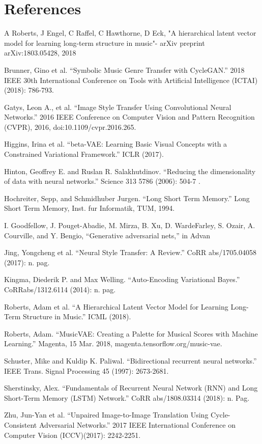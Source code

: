 \documentclass{article}
\begin{document}



\section{References}

A Roberts, J Engel, C Raffel, C Hawthorne, D Eck, "A hierarchical latent vector model for learning long-term structure in music"- arXiv preprint arXiv:1803.05428, 2018

Brunner, Gino et al. “Symbolic Music Genre Transfer with CycleGAN.” 2018 IEEE 30th International Conference on Tools with Artificial Intelligence (ICTAI) (2018): 786-793.

Gatys, Leon A., et al. “Image Style Transfer Using Convolutional Neural Networks.” 2016 IEEE Conference on Computer Vision and Pattern Recognition (CVPR), 2016, doi:10.1109/cvpr.2016.265.

Higgins, Irina et al. “beta-VAE: Learning Basic Visual Concepts with a Constrained Variational Framework.” ICLR (2017).

Hinton, Geoffrey E. and Ruslan R. Salakhutdinov. “Reducing the dimensionality of data with neural networks.” Science 313 5786 (2006): 504-7 .

Hochreiter, Sepp, and Schmidhuber Jurgen. “Long Short Term Memory.” Long Short Term Memory, Inst. fur Informatik, TUM, 1994.

I. Goodfellow, J. Pouget-Abadie, M. Mirza, B. Xu, D. WardeFarley, S. Ozair, A. Courville, and Y. Bengio, “Generative adversarial nets,” in Advan

Jing, Yongcheng et al. “Neural Style Transfer: A Review.” CoRR abs/1705.04058 (2017): n. pag.

Kingma, Diederik P. and Max Welling. “Auto-Encoding Variational Bayes.” CoRRabs/1312.6114 (2014): n. pag.

Roberts, Adam et al. “A Hierarchical Latent Vector Model for Learning Long-Term Structure in Music.” ICML (2018).

Roberts, Adam. “MusicVAE: Creating a Palette for Musical Scores with Machine Learning.” Magenta, 15 Mar. 2018, magenta.tensorflow.org/music-vae.

Schuster, Mike and Kuldip K. Paliwal. “Bidirectional recurrent neural networks.” IEEE Trans. Signal Processing 45 (1997): 2673-2681.

Sherstinsky, Alex. “Fundamentals of Recurrent Neural Network (RNN) and Long Short-Term Memory (LSTM) Network.” CoRR abs/1808.03314 (2018): n. Pag.

Zhu, Jun-Yan et al. “Unpaired Image-to-Image Translation Using Cycle-Consistent Adversarial Networks.” 2017 IEEE International Conference on Computer Vision (ICCV)(2017): 2242-2251.
\end{document}
